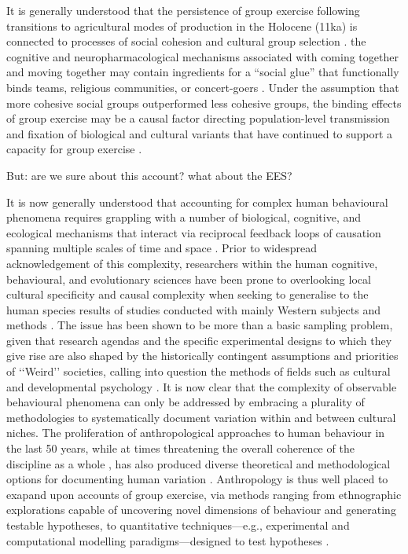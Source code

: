 It is generally understood that the persistence of group exercise following transitions to agricultural modes of production in the Holocene (11ka) is connected to processes of social cohesion and cultural group selection \citep{Dunbar2010,Whitehouse2004,Cohen2017}. the cognitive and neuropharmacological mechanisms associated with coming together and moving together may contain ingredients for a ``social glue'' that functionally binds teams, religious communities, or concert-goers \citep{Cohen2009,Fischer2014a}.  Under the assumption that more cohesive social groups outperformed less cohesive groups, the binding effects of group exercise may be a causal factor directing population-level transmission and fixation of biological and cultural variants that have continued to support a capacity for group exercise \citep{Claidiere2014,Henrich2015}.

But: are we sure about this account?  what about the EES?

It is now generally understood that accounting for complex human behavioural phenomena requires grappling with a number of biological, cognitive, and ecological mechanisms that interact via reciprocal feedback loops of causation spanning multiple scales of time and space \citep{Fuentes2015}.  Prior to widespread acknowledgement of this complexity, researchers within the human cognitive, behavioural, and evolutionary sciences have been prone to overlooking local cultural specificity and causal complexity when seeking to generalise to the human species results of studies conducted with mainly Western subjects and methods \citep{Henrich2010d}.  The issue has been shown to be more than a basic sampling problem, given that research agendas and the specific experimental designs to which they give rise are also shaped by the historically contingent assumptions and priorities of ‘‘Weird’’ societies, calling into question the methods of fields such as cultural and developmental psychology \citep{Whitehouse2012}.  It is now clear that the complexity of observable behavioural phenomena can only be addressed by embracing a plurality of methodologies to systematically document variation within and between cultural niches.  The proliferation of anthropological approaches to human behaviour in the last 50 years, while at times threatening the overall coherence of the discipline as a whole \citep{}, has also produced diverse theoretical and methodological options for documenting human variation \citep{Fuentes2016a}.  Anthropology is thus well placed to exapand upon accounts of group exercise, via methods ranging from ethnographic explorations capable of uncovering novel dimensions of behaviour and generating testable hypotheses, to quantitative techniques---e.g., experimental and computational modelling paradigms---designed to test hypotheses \citep{Fuentes2016}.

